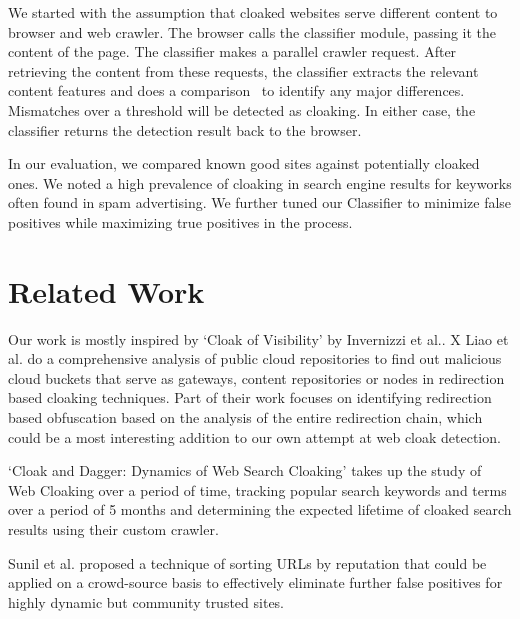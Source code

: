 \documentclass[letterpaper,twocolumn,10pt]{article}
\begin{document}
We started with the assumption that cloaked websites serve different content to browser and web crawler.  The browser calls the classifier module, passing it the content of the page.  The classifier makes a parallel crawler request. After retrieving the content from these requests, the classifier extracts the relevant content features and does a comparison~\cite{cloak} to identify any major differences.  Mismatches over a threshold will be detected as cloaking.  In either case, the classifier returns the detection result back to the browser.


In our evaluation, we compared known good sites against potentially cloaked ones. We noted a high prevalence of cloaking in search engine results for keyworks often found in spam advertising.  We further tuned our Classifier to minimize false positives while maximizing true positives in the process.

\section{Related Work}
Our work is mostly inspired by `Cloak of Visibility' by Invernizzi et al.\cite{cloak}. X Liao et al.\cite{liao2016lurking} do a comprehensive analysis of public cloud repositories to find out malicious cloud buckets that serve as gateways, content repositories or nodes in redirection based cloaking techniques. Part of their work focuses on identifying redirection based obfuscation based on the analysis of the entire redirection chain, which could be a most interesting addition to our own attempt at web cloak detection.

`Cloak and Dagger: Dynamics of Web Search Cloaking'\cite{Wang:2011:CDD:2046707.2046763} takes up the study of Web Cloaking over a period of time, tracking popular search keywords and terms over a period of 5 months and determining the expected lifetime of cloaked search results using their custom crawler.

Sunil et al.\cite{sunil2012reputation} proposed a technique of sorting URLs by reputation that could be applied on a crowd-source basis to effectively eliminate further false positives for highly dynamic but community trusted sites.
\end{document}
